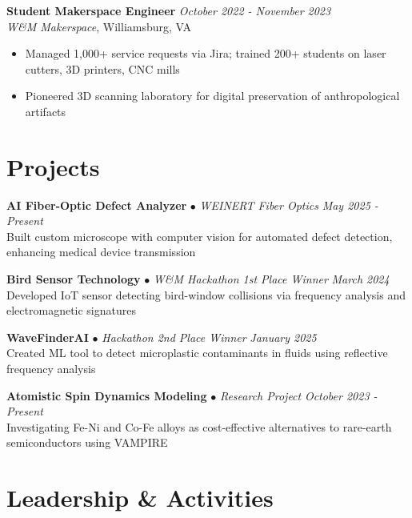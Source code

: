 \documentclass[11pt,letterpaper]{article}
\newcommand{\daterange}[1]{\textit{\color{secondary}#1}}
\newcommand{\position}[1]{\textbf{#1}}
\newcommand{\organization}[1]{\textit{#1}}
\begin{document}
\vspace{3pt}
\noindent
\position{Student Makerspace Engineer} \hfill \daterange{October 2022 - November 2023}\\
\organization{W\&M Makerspace}, Williamsburg, VA
\begin{itemize}
    \item Managed 1,000+ service requests via Jira; trained 200+ students on laser cutters, 3D printers, CNC mills
    \item Pioneered 3D scanning laboratory for digital preservation of anthropological artifacts
\end{itemize}

\section{Projects}

\noindent
\textbf{AI Fiber-Optic Defect Analyzer} $\bullet$ \organization{WEINERT Fiber Optics} \hfill \daterange{May 2025 - Present}\\
Built custom microscope with computer vision for automated defect detection, enhancing medical device transmission

\vspace{2pt}
\noindent
\textbf{Bird Sensor Technology} $\bullet$ \organization{W\&M Hackathon 1st Place Winner} \hfill \daterange{March 2024}\\
Developed IoT sensor detecting bird-window collisions via frequency analysis and electromagnetic signatures

\vspace{2pt}
\noindent
\textbf{WaveFinderAI} $\bullet$ \organization{Hackathon 2nd Place Winner} \hfill \daterange{January 2025}\\
Created ML tool to detect microplastic contaminants in fluids using reflective frequency analysis

\vspace{2pt}
\noindent
\textbf{Atomistic Spin Dynamics Modeling} $\bullet$ \organization{Research Project}  \hfill \daterange{October 2023 - Present}\\
Investigating Fe-Ni and Co-Fe alloys as cost-effective alternatives to rare-earth semiconductors using VAMPIRE

\section{Leadership \& Activities}
\end{document}
